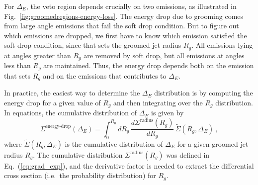 \documentclass[letterpaper,11pt]{article}
\DeclareRobustCommand{\Fig}[1]{Fig.~\ref{#1}}
\DeclareRobustCommand{\Eq}[1]{Eq.~(\ref{#1})}
\begin{document}
For $\Delta_E$, the veto region depends crucially on two emissions, as illustrated in \Fig{fig:groomedregions-energy-loss}.  The energy drop due to grooming comes from large angle emissions that fail the soft drop condition.  But to figure out which emissions are dropped, we first have to know which emission satisfied the soft drop condition, since that sets the groomed jet radius $R_g$.  All emissions lying at angles greater than $R_g$ are removed by soft drop, but all emissions at angles less than $R_g$ are maintained.  Thus, the energy drop depends both on the emission that sets $R_g$ and on the emissions that contributes to $\Delta_E$.

In practice, the easiest way to determine the $\Delta_E$ distribution is by computing the energy drop for a given value of $R_g$ and then integrating over the $R_g$ distribution.  In equations, the cumulative distribution of $\Delta_E$ is given by
\begin{equation}\label{eq:elossdef}
\Sigma^\text{energy-drop}(\Delta_E) = \int_0^{R_0} dR_g \, \frac{d \Sigma^\text{radius}(R_g)}{d R_g}\, \widetilde{\Sigma}(R_g,\Delta_E) \ ,
\end{equation}
where $\widetilde{\Sigma}(R_g,\Delta_E)$ is the cumulative distribution of $\Delta_E$ for a given groomed jet radius $R_g$.  The cumulative distribution $\Sigma^\text{radius}(R_g)$ was defined in \Eq{eq:grad_exp}, and the derivative factor is needed to extract the differential cross section (i.e.\ the probability distribution) for $R_g$.
\end{document}
